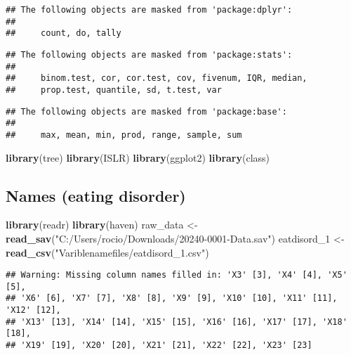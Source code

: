\documentclass[]{article}
\newenvironment{Shaded}{\begin{snugshade}}{\end{snugshade}}
\newcommand{\KeywordTok}[1]{\textcolor[rgb]{0.13,0.29,0.53}{\textbf{#1}}}
\newcommand{\DecValTok}[1]{\textcolor[rgb]{0.00,0.00,0.81}{#1}}
\newcommand{\StringTok}[1]{\textcolor[rgb]{0.31,0.60,0.02}{#1}}
\newcommand{\NormalTok}[1]{#1}
\begin{document}
\begin{verbatim}
## The following objects are masked from 'package:dplyr':
## 
##     count, do, tally
\end{verbatim}

\begin{verbatim}
## The following objects are masked from 'package:stats':
## 
##     binom.test, cor, cor.test, cov, fivenum, IQR, median,
##     prop.test, quantile, sd, t.test, var
\end{verbatim}

\begin{verbatim}
## The following objects are masked from 'package:base':
## 
##     max, mean, min, prod, range, sample, sum
\end{verbatim}

\begin{Shaded}
\begin{Highlighting}[]
\KeywordTok{library}\NormalTok{(tree)}
\KeywordTok{library}\NormalTok{(ISLR)}
\KeywordTok{library}\NormalTok{(ggplot2)}
\KeywordTok{library}\NormalTok{(class)}
\end{Highlighting}
\end{Shaded}

\subsection{Names (eating disorder)}\label{names-eating-disorder}

\begin{Shaded}
\begin{Highlighting}[]
\KeywordTok{library}\NormalTok{(readr)}
\KeywordTok{library}\NormalTok{(haven)}
\NormalTok{raw_data <-}\StringTok{ }\KeywordTok{read_sav}\NormalTok{(}\StringTok{"C:/Users/rocio/Downloads/20240-0001-Data.sav"}\NormalTok{)}
\NormalTok{eatdisord_}\DecValTok{1}\NormalTok{ <-}\StringTok{ }\KeywordTok{read_csv}\NormalTok{(}\StringTok{"Variblenamefiles/eatdisord_1.csv"}\NormalTok{)}
\end{Highlighting}
\end{Shaded}

\begin{verbatim}
## Warning: Missing column names filled in: 'X3' [3], 'X4' [4], 'X5' [5],
## 'X6' [6], 'X7' [7], 'X8' [8], 'X9' [9], 'X10' [10], 'X11' [11], 'X12' [12],
## 'X13' [13], 'X14' [14], 'X15' [15], 'X16' [16], 'X17' [17], 'X18' [18],
## 'X19' [19], 'X20' [20], 'X21' [21], 'X22' [22], 'X23' [23]
\end{verbatim}
\end{document}
